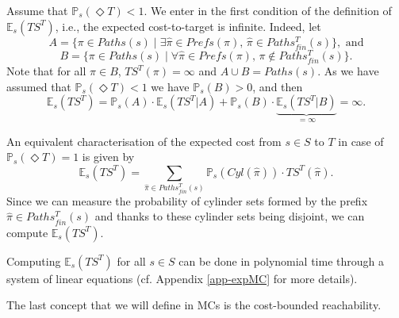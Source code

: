\begin{remark}
Assume that $\mathbb{P}_s(\Diamond T) < 1$. We enter in the first condition of the definition of $\mathbb{E}_s(TS^T)$, i.e., the expected cost-to-target is infinite. Indeed, let
\[A = \{\pi \in Paths(s) \; | \; \exists \hat{\pi} \in Prefs(\pi), \, \hat{\pi} \in Paths^T_{fin}(s)\}, \text{ and}\]
\[B=\{ \pi \in Paths(s) \; | \; \forall
\hat{\pi} \in Prefs(\pi), \, \pi \not\in Paths^T_{fin}(s)\}.\]
Note that for all $\pi \in B$, $TS^T(\pi) = \infty$ and $A \cup B = Paths(s)$.
As we have assumed that $\mathbb{P}_s(\Diamond T) < 1$
we have $\mathbb{P}_s(B) > 0$, and then
\[
  \mathbb{E}_s(TS^T) = \mathbb{P}_s(A) \cdot \mathbb{E}_s(TS^T | A) + \mathbb{P}_s(B) \cdot \underbrace{\mathbb{E}_s(TS^T | B)}_{=\infty} = \infty.
\]
\end{remark}
\begin{remark}
An equivalent characterisation of the expected cost from $s \in S$ to $T$ in case of $\mathbb{P}_s(\Diamond T) = 1$ is given by
\[
  \mathbb{E}_s(TS^T) = \sum_{\hat{\pi} \in Paths_{fin}^T(s)} \mathbb{P}_s(Cyl(\hat{\pi})) \cdot TS^T(\hat{\pi}).
\]
Since we can measure the probability of cylinder sets formed by the prefix $\hat{\pi} \in Paths_{fin}^T(s)$ and thanks to these cylinder sets being disjoint, we can compute $\mathbb{E}_s(TS^T)$.
\end{remark}

\begin{theorem}
  Computing $\mathbb{E}_s(TS^T)$ for all $s \in S$ can be done in polynomial time through a system of linear equations (cf. Appendix \ref{app-expMC} for more details).
\end{theorem}

The last concept that we will define in MCs is the cost-bounded reachability.

